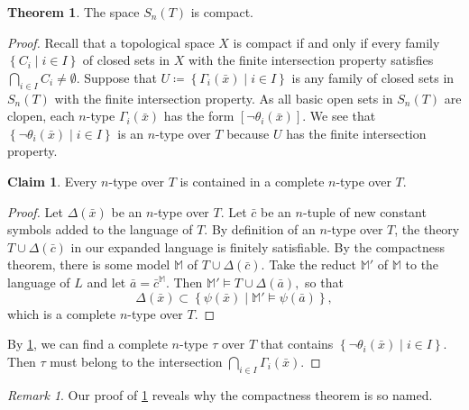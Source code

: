\documentclass[10pt,letterpaper,cm]{nupset}
\theoremstyle{definition}
\theoremstyle{theorem}
\newtheorem{theorem}[definition]{Theorem}
\newtheorem{claim}{Claim}
\theoremstyle{remark}
\newtheorem*{remark}{Remark}
\newcommand{\1}{\mathbb{1}}
\newcommand{\0}{\vec 0}
\begin{document}
\begin{theorem}\label{Stonecomp}
The space $S_n(T)$ is compact.
\end{theorem}
\begin{proof}
Recall that a topological space $X$ is compact if and only if every family $\left\{C_i \mid i\in I\right\}$ of closed sets in $X$
with the finite intersection property satisfies $\bigcap_{i\in I}C_i \ne \emptyset$. Suppose that $U\coloneqq \left\{\Gamma_i(\bar{x}) \mid i\in I\right\}$ is any family of closed sets in $S_n(T)$ with the finite intersection property. As all basic open sets in $S_n(T)$ are clopen, each $n$-type $\Gamma_i(\bar{x})$ has the form $\left[\neg{\theta_i(\bar{x})}\right]$. We see that $\left\{\neg{\theta_i(\bar{x})}\mid i\in I\right\}$ is an $n$-type over $T$ because $U$ has the finite intersection property.
\begin{claim}\label{compcon}
Every $n$-type  over $T$ is contained in a complete $n$-type over $T$.
\end{claim}
\begin{proof}
Let $\Delta(\bar{x})$ be an $n$-type over $T$. Let $\bar{c}$ be an $n$-tuple of new constant symbols added to the language of $T$. By definition of  an $n$-type over $T$, the theory $T\cup  \Delta(\bar{c})$ in our expanded language is finitely satisfiable. By the compactness theorem, there is some model $\mathbb{M}$ of $T\cup  \Delta(\bar{c})$. Take the reduct $\mathbb{M}'$ of $\mathbb{M}$ to the language of $L$ and let $\bar{a} = \bar{c}^{\mathbb{M}}$. Then $\mathbb{M}' \models T\cup  \Delta(\bar{a}),$ so that 
\[
\Delta(\bar{x})
\subset
\left\{\psi(\bar{x})\mid \mathbb{M}' \models \psi(\bar{a})\right\},
\] which is a complete $n$-type over $T$.
\end{proof}
By \cref{compcon}, we can find a complete $n$-type $\tau$ over $T$ that contains $\left\{\neg{\theta_i(\bar{x})}\mid i\in I\right\}$. Then $\tau$ must belong to the intersection $\bigcap_{i\in I}\Gamma_i(\bar{x})$.
\end{proof}

\begin{remark}
Our proof of \cref{Stonecomp} reveals why the compactness theorem is so named.
\end{remark}

\pagebreak
\end{document}
